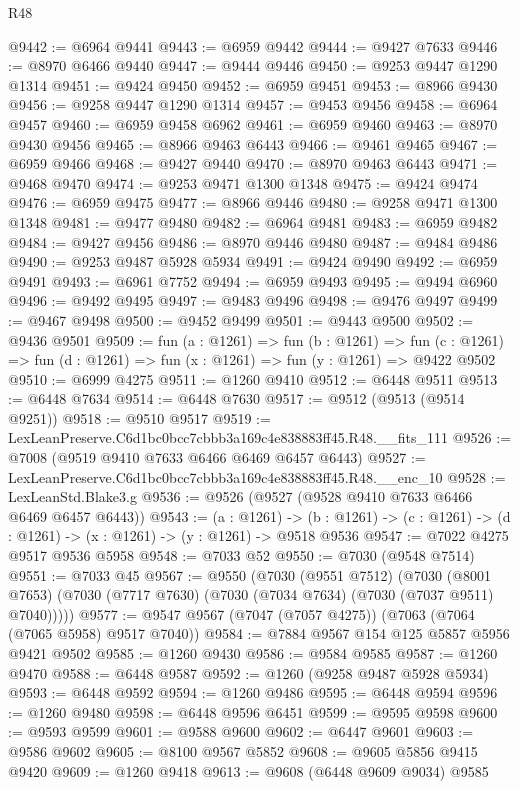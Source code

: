 \begin{lexlean}{R48}
\begin{coremodule}
@9442 := @6964 @9441
@9443 := @6959 @9442
@9444 := @9427 @7633
@9446 := @8970 @6466 @9440
@9447 := @9444 @9446
@9450 := @9253 @9447 @1290 @1314
@9451 := @9424 @9450
@9452 := @6959 @9451
@9453 := @8966 @9430
@9456 := @9258 @9447 @1290 @1314
@9457 := @9453 @9456
@9458 := @6964 @9457
@9460 := @6959 @9458 @6962
@9461 := @6959 @9460
@9463 := @8970 @9430 @9456
@9465 := @8966 @9463 @6443
@9466 := @9461 @9465
@9467 := @6959 @9466
@9468 := @9427 @9440
@9470 := @8970 @9463 @6443
@9471 := @9468 @9470
@9474 := @9253 @9471 @1300 @1348
@9475 := @9424 @9474
@9476 := @6959 @9475
@9477 := @8966 @9446
@9480 := @9258 @9471 @1300 @1348
@9481 := @9477 @9480
@9482 := @6964 @9481
@9483 := @6959 @9482
@9484 := @9427 @9456
@9486 := @8970 @9446 @9480
@9487 := @9484 @9486
@9490 := @9253 @9487 @5928 @5934
@9491 := @9424 @9490
@9492 := @6959 @9491
@9493 := @6961 @7752
@9494 := @6959 @9493
@9495 := @9494 @6960
@9496 := @9492 @9495
@9497 := @9483 @9496
@9498 := @9476 @9497
@9499 := @9467 @9498
@9500 := @9452 @9499
@9501 := @9443 @9500
@9502 := @9436 @9501
@9509 := fun (a : @1261) =>
  fun (b : @1261) =>
  fun (c : @1261) => fun (d : @1261) => fun (x : @1261) => fun (y : @1261) => @9422 @9502
@9510 := @6999 @4275
@9511 := @1260 @9410
@9512 := @6448 @9511
@9513 := @6448 @7634
@9514 := @6448 @7630
@9517 := @9512 (@9513 (@9514 @9251))
@9518 := @9510 @9517
@9519 := LexLeanPreserve.C6d1bc0bcc7cbbb3a169c4e838883ff45.R48.__fits_111
@9526 := @7008 (@9519 @9410 @7633 @6466 @6469 @6457 @6443)
@9527 := LexLeanPreserve.C6d1bc0bcc7cbbb3a169c4e838883ff45.R48.__enc_10
@9528 := LexLeanStd.Blake3.g
@9536 := @9526 (@9527 (@9528 @9410 @7633 @6466 @6469 @6457 @6443))
@9543 := (a : @1261) ->
  (b : @1261) -> (c : @1261) -> (d : @1261) -> (x : @1261) -> (y : @1261) -> @9518 @9536
@9547 := @7022 @4275 @9517 @9536 @5958
@9548 := @7033 @52
@9550 := @7030 (@9548 @7514)
@9551 := @7033 @45
@9567 := @9550
    (@7030
      (@9551 @7512)
      (@7030 (@8001 @7653) (@7030 (@7717 @7630) (@7030 (@7034 @7634) (@7030 (@7037 @9511) @7040)))))
@9577 := @9547 @9567 (@7047 (@7057 @4275)) (@7063 (@7064 (@7065 @5958) @9517 @7040))
@9584 := @7884 @9567 @154 @125 @5857 @5956 @9421 @9502
@9585 := @1260 @9430
@9586 := @9584 @9585
@9587 := @1260 @9470
@9588 := @6448 @9587
@9592 := @1260 (@9258 @9487 @5928 @5934)
@9593 := @6448 @9592
@9594 := @1260 @9486
@9595 := @6448 @9594
@9596 := @1260 @9480
@9598 := @6448 @9596 @6451
@9599 := @9595 @9598
@9600 := @9593 @9599
@9601 := @9588 @9600
@9602 := @6447 @9601
@9603 := @9586 @9602
@9605 := @8100 @9567 @5852
@9608 := @9605 @5856 @9415 @9420
@9609 := @1260 @9418
@9613 := @9608 (@6448 @9609 @9034) @9585

\end{coremodule}
\end{lexlean}
